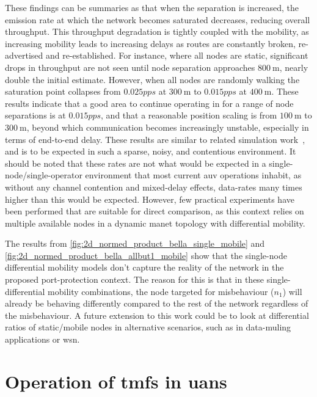 These findings can be summaries as that when the separation is increased, the emission rate at which the network becomes saturated decreases, reducing overall throughput. 
This throughput degradation is tightly coupled with the mobility, as increasing mobility leads to increasing delays as routes are constantly broken, re-advertised and re-established. 
For instance, where all nodes are static, significant drops in throughput are not seen until node separation approaches $\SI{800}{\meter}$, nearly double the initial estimate. 
However, when all nodes are randomly walking the saturation point collapses from $0.025pps$ at $\SI{300}{\meter}$ to $0.015pps$ at $\SI{400}{\meter}$.
These results indicate that a good area to continue operating in for a range of node separations is at $0.015pps$, and that a reasonable position scaling is from $\SI{100}{\meter}$ to $\SI{300}{\meter}$, beyond which communication becomes increasingly unstable, especially in terms of end-to-end delay.
These results are similar to related simulation work~\cite{Miquel2008,Diamant2010,Noh2012}, and is to be expected in such a sparse, noisy, and contentious environment.
It should be noted that these rates are not what would be expected in a single-node/single-operator environment that most current \gls{auv} operations inhabit, as without any channel contention and mixed-delay effects, data-rates many times higher than this would be expected.
However, few practical experiments have been performed that are suitable for direct comparison, as this context relies on multiple available nodes in a dynamic \gls{manet} topology with differential mobility.


The results from \autoref{fig:2d_normed_product_bella_single_mobile} and \autoref{fig:2d_normed_product_bella_allbut1_mobile} show that the single-node differential mobility models don't capture the reality of the network in the proposed port-protection context.
The reason for this is that in these single-differential mobility combinations, the node targeted for misbehaviour ($n_1$) will already be behaving differently compared to the rest of the network regardless of the misbehaviour.
A future extension to this work could be to look at differential ratios of static/mobile nodes in alternative scenarios, such as in data-muling applications or \gls{wsn}.

\section{Operation of \glspl{tmf} in \glspl{uan}}

